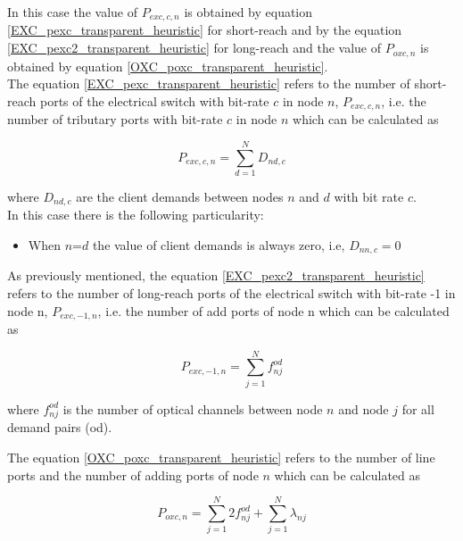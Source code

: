 In this case the value of $P_{exc,c,n}$ is obtained by equation \ref{EXC_pexc_transparent_heuristic} for short-reach and by the equation \ref{EXC_pexc2_transparent_heuristic} for long-reach and the value of $P_{oxc,n}$ is obtained by equation \ref{OXC_poxc_transparent_heuristic}.\\

The equation \ref{EXC_pexc_transparent_heuristic} refers to the number of short-reach ports of the electrical switch with bit-rate $c$ in node $n$, $P_{exc,c,n}$, i.e. the number of tributary ports with bit-rate $c$ in node $n$ which can be calculated as

\begin{equation}
P_{exc,c,n} = \sum_{d=1}^{N} D_{nd,c}
\label{EXC_pexc_transparent_heuristic}
\end{equation}

\noindent
where $D_{nd,c}$ are the client demands between nodes $n$ and $d$ with bit rate $c$.\\

\noindent
In this case there is the following particularity:

\begin{itemize}
  \item When $n$=$d$ the value of client demands is always zero, i.e, $D_{nn,c}=0$
\end{itemize}

As previously mentioned, the equation \ref{EXC_pexc2_transparent_heuristic} refers to the number of long-reach ports of the electrical switch with bit-rate -1 in node n, $P_{exc,-1,n}$, i.e. the number of add ports of node n which can be calculated as

\begin{equation}
P_{exc,-1,n} = \sum_{j=1}^{N} f_{nj}^{od}
\label{EXC_pexc2_transparent_heuristic}
\end{equation}

\noindent
where $f_{nj}^{od}$ is the number of optical channels between node $n$ and node $j$ for all demand pairs (od).

\vspace{11pt}
The equation \ref{OXC_poxc_transparent_heuristic} refers to the number of line ports and the number of adding ports of node $n$ which can be calculated as

\begin{equation}
P_{oxc,n} = \sum_{j=1}^{N} 2 f_{nj}^{od} + \sum_{j=1}^{N} \lambda_{nj}
\label{OXC_poxc_transparent_heuristic}
\end{equation}

